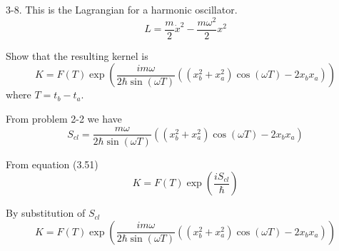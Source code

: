 \documentclass[12pt]{article}
\begin{document}
3-8.
This is the Lagrangian for a harmonic oscillator.
\begin{equation*}
L=\frac{m}{2}\dot x^2-\frac{m\omega^2}{2}x^2
\end{equation*}

Show that the resulting kernel is
\begin{equation*}
K=F(T)\exp\left(
\frac{im\omega}{2\hbar\sin(\omega T)}
\left((x_b^2+x_a^2)\cos(\omega T)-2x_b x_a\right)
\right)
\end{equation*}
where $T=t_b-t_a$.

\bigskip
From problem 2-2 we have
\begin{equation*}
S_{cl}=\frac{m\omega}{2\hbar\sin(\omega T)}
\left((x_b^2+x_a^2)\cos(\omega T)-2x_b x_a\right)
\end{equation*}

From equation (3.51)
\begin{equation*}
K=F(T)\exp\left(
\frac{iS_{cl}}{\hbar}
\right)
\end{equation*}

By substitution of $S_{cl}$
\begin{equation*}
K=F(T)\exp\left(
\frac{im\omega}{2\hbar\sin(\omega T)}
\left((x_b^2+x_a^2)\cos(\omega T)-2x_b x_a\right)
\right)
\end{equation*}
\end{document}

